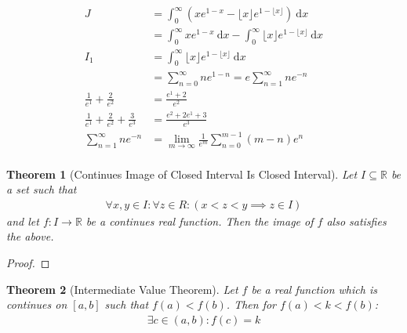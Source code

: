 \documentclass[a4paper,11pt]{article}
\theoremstyle{plain}
\newtheorem{theorem}{Theorem}
\theoremstyle{definition}
\newcommand{\R}{\mathbb{R}}
\newcommand{\dx}{\text{d}}
\begin{document}
\begin{align*}
	J&=\int_0^\infty \left(xe^{1-x}
	-\lfloor x\rfloor e^{1-\lfloor x \rfloor}\right)\ \dx x\\
	&=\int_0^\infty xe^{1-x}\ \dx x-
	\int_0^\infty\lfloor x\rfloor e^{1-\lfloor x \rfloor}\ \dx x\\
	I_1&=\int_0^\infty\lfloor x\rfloor e^{1-\lfloor x \rfloor}\ \dx x\\
	&=\sum_{n=0}^\infty ne^{1-n}=e\sum_{n=1}^\infty ne^{-n}\\
	\frac{1}{e^1}+\frac{2}{e^2}&=\frac{e^1+2}{e^2}\\
	\frac{1}{e^1}+\frac{2}{e^2}+\frac{3}{e^3}&=\frac{e^2+2e^1+3}{e^3}\\
	\sum_{n=1}^\infty ne^{-n}&=\lim_{m\rightarrow\infty}
	\frac{1}{e^m}\sum_{n=0}^{m-1}(m-n)e^{n}\\
\end{align*}
\newpage
\begin{theorem}[Continues Image of Closed Interval Is Closed Interval]
	Let $I\subseteq \R$ be a set such that
	\begin{equation}
	\begin{aligned}
		\forall x,y\in I: \forall z\in R: (x<z<y\implies z\in I)
	\end{aligned}
	\end{equation}
	and let $f:I\rightarrow \R$ be a continues real function. Then the image of
	$f$ also satisfies the above.
\end{theorem}
\begin{proof}
\end{proof}
\begin{theorem}[Intermediate Value Theorem]\label{th1}
	Let $f$ be a real function which is continues on $[a,b]$ such that
	$f(a)<f(b)$. Then for $f(a)<k<f(b)$:
	\begin{equation}
	\begin{aligned}
		\exists c \in (a,b):f(c) =k
	\end{aligned}
	\end{equation}
\end{theorem}
\end{document}
